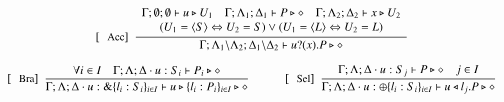 \begin{figure}[!t]
\[\begin{array}{c}
		\trule{Acc}~~\tree{
			\begin{array}{c}
				\Gamma; \emptyset; \emptyset \proves u \hastype U_1
				\quad
				\Gamma; \Lambda_1; \Delta_1 \proves P \hastype \Proc
				\quad
				\Gamma; \Lambda_2; \Delta_2 \proves x \hastype U_2
				\\
				(U_1 = \chtype{S} \Leftrightarrow U_2 = S)
				\lor
				(U_1 = \chtype{L} \Leftrightarrow U_2 = L)
			\end{array}
		}{
			\Gamma; \Lambda_1 \backslash \Lambda_2; \Delta_1 \backslash \Delta_2 \proves \binp{u}{x} P \hastype \Proc
		}
		\\[6mm]



		\trule{Bra}~~\tree{
			 \forall i \in I \quad \Gamma; \Lambda; \Delta \cat u:S_i \proves P_i \hastype \Proc
		}{
			\Gamma; \Lambda; \Delta \cat u: \btbra{l_i:S_i}_{i \in I} \proves \bbra{u}{l_i:P_i}_{i \in I}\hastype \Proc
		}
		\qquad\quad 
	 	\trule{Sel}~~\tree{
			\Gamma; \Lambda; \Delta \cat u: S_j  \proves P \hastype \Proc \quad j \in I
		}{
			\Gamma; \Lambda; \Delta \cat u:\btsel{l_i:S_i}_{i \in I} \proves \bsel{u}{l_j} P \hastype \Proc
		}
		\\[6mm]

%


\end{array}\]
\end{figure}
